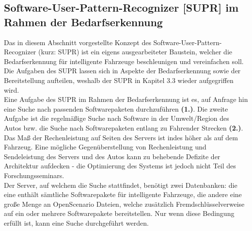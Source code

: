 \subsection{Software-User-Pattern-Recognizer [SUPR] im Rahmen der Bedarfserkennung}\label{2.3}
Das in diesem Abschnitt vorgestellte Konzept des Software-User-Pattern-Recognizer (kurz: SUPR) ist ein eigens ausgearbeiteter Baustein, welcher die Bedarfserkennung für intelligente Fahrzeuge beschleunigen und vereinfachen soll. Die Aufgaben des SUPR lassen sich in Aspekte der Bedarfserkennung sowie der Bereitstellung aufteilen, weshalb der SUPR in Kapitel 3.3 wieder aufgegriffen wird.\\
Eine Aufgabe des SUPR im Rahmen der Bedarfserkennung ist es, auf Anfrage hin eine Suche nach passenden Softwarepaketen durchzuführen \textbf{(1.)}. Die zweite Aufgabe ist die regelmäßige Suche nach Software in der Umwelt/Region des Autos bzw. die Suche nach Softwarepaketen entlang zu Fahrender Strecken \textbf{(2.)}. Das Maß der Rechenleistung auf Seiten des Servers ist indes höher als auf dem Fahrzeug. Eine mögliche Gegenüberstellung von Rechenleistung und Sendeleistung des Servers und des Autos kann zu behebende Defizite der Architektur aufdecken - die Optimierung des Systems ist jedoch nicht Teil des Forschungsseminars.\\
Der Server, auf welchem die Suche stattfindet, benötigt zwei Datenbanken: die eine enthält sämtliche Softwarepakete für intelligente Fahrzeuge, die andere eine große Menge an OpenScenario Dateien, welche zusätzlich Fremdschlüsselverweise auf ein oder mehrere Softwarepakete bereitstellen. Nur wenn diese Bedingung erfüllt ist, kann eine Suche durchgeführt werden. 

